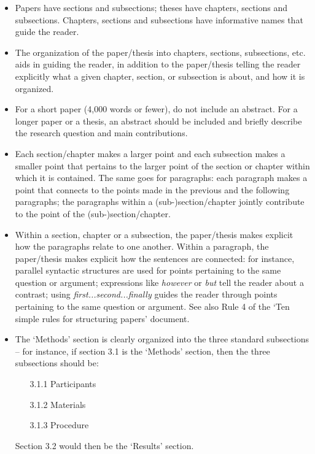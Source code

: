 \documentclass[11pt,fleqn,a4paper/thesis]{article}
\newcommand{\6}{\mbox{$[\hspace*{-.6mm}[$}}
\newcommand{\9}{\mbox{$]\hspace*{-.6mm}]$}}
\begin{document}
\begin{itemize}[itemsep=-1pt,leftmargin=2.5ex,topsep=-2pt]

\item Papers have sections and subsections; theses have chapters, sections and subsections. Chapters, sections and subsections have informative names that guide the reader.

\item The organization of the paper/thesis into chapters, sections, subsections, etc. aids in guiding the reader, in addition to the paper/thesis telling the reader explicitly what a given chapter, section, or subsection is about, and how it is organized.

\item For a short paper (4,000 words or fewer), do not include an abstract. For a longer paper or a thesis, an abstract should be included and briefly describe the research question and main contributions.

\item Each section/chapter makes a larger point and each subsection makes a smaller point that pertains to the larger point of the section or chapter within
which it is contained. The same goes for paragraphs: each paragraph makes a point that connects to the points made in the previous and the following
paragraphs; the paragraphs within a (sub-)section/chapter jointly contribute to the point of the (sub-)section/chapter.

\item Within a section, chapter or a subsection, the paper/thesis makes explicit how the paragraphs relate to one another. Within a paragraph, the paper/thesis makes explicit how the sentences are connected: for instance, parallel syntactic structures are used for points pertaining to the same question or argument; expressions like {\em however} or {\em but} tell the reader about a contrast; using {\em first...second...finally} guides the reader through points pertaining to the same question or argument. See also Rule 4 of the `Ten simple rules for structuring papers' document.

\item The `Methods' section is clearly organized into the three standard subsections -- for instance, if section 3.1 is the `Methods' section, then the three subsections should be:

\begin{itemize}
\item[3.1.1] Participants
\item[3.1.2] Materials
\item[3.1.3] Procedure
\end{itemize}

Section 3.2 would then be the `Results' section.

\end{itemize}
\end{document}
